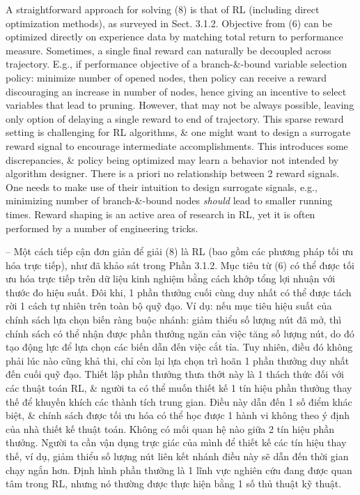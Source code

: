 \documentclass{article}
\begin{document}
\begin{itemize}
\begin{itemize}
        A straightforward approach for solving (8) is that of RL (including direct optimization methods), as surveyed in Sect. 3.1.2. Objective from (6) can be optimized directly on experience data by matching total return to performance measure. Sometimes, a single final reward can naturally be decoupled across trajectory. E.g., if performance objective of a branch-\&-bound variable selection policy: minimize number of opened nodes, then policy can receive a reward discouraging an increase in number of nodes, hence giving an incentive to select variables that lead to pruning. However, that may not be always possible, leaving only option of delaying a single reward to end of trajectory. This sparse reward setting is challenging for RL algorithms, \& one might want to design a surrogate reward signal to encourage intermediate accomplishments. This introduces some discrepancies, \& policy being optimized may learn a behavior not intended by algorithm designer. There is a priori no relationship between 2 reward signals. One needs to make use of their intuition to design surrogate signals, e.g., minimizing number of branch-\&-bound nodes {\it should} lead to smaller running times. Reward shaping is an active area of research in RL, yet it is often performed by a number of engineering tricks.

        -- Một cách tiếp cận đơn giản để giải (8) là RL (bao gồm các phương pháp tối ưu hóa trực tiếp), như đã khảo sát trong Phần 3.1.2. Mục tiêu từ (6) có thể được tối ưu hóa trực tiếp trên dữ liệu kinh nghiệm bằng cách khớp tổng lợi nhuận với thước đo hiệu suất. Đôi khi, 1 phần thưởng cuối cùng duy nhất có thể được tách rời 1 cách tự nhiên trên toàn bộ quỹ đạo. Ví dụ: nếu mục tiêu hiệu suất của chính sách lựa chọn biến ràng buộc nhánh: giảm thiểu số lượng nút đã mở, thì chính sách có thể nhận được phần thưởng ngăn cản việc tăng số lượng nút, do đó tạo động lực để lựa chọn các biến dẫn đến việc cắt tỉa. Tuy nhiên, điều đó không phải lúc nào cũng khả thi, chỉ còn lại lựa chọn trì hoãn 1 phần thưởng duy nhất đến cuối quỹ đạo. Thiết lập phần thưởng thưa thớt này là 1 thách thức đối với các thuật toán RL, \& người ta có thể muốn thiết kế 1 tín hiệu phần thưởng thay thế để khuyến khích các thành tích trung gian. Điều này dẫn đến 1 số điểm khác biệt, \& chính sách được tối ưu hóa có thể học được 1 hành vi không theo ý định của nhà thiết kế thuật toán. Không có mối quan hệ nào giữa 2 tín hiệu phần thưởng. Người ta cần vận dụng trực giác của mình để thiết kế các tín hiệu thay thế, ví dụ, giảm thiểu số lượng nút liên kết nhánh {điều này sẽ} dẫn đến thời gian chạy ngắn hơn. Định hình phần thưởng là 1 lĩnh vực nghiên cứu đang được quan tâm trong RL, nhưng nó thường được thực hiện bằng 1 số thủ thuật kỹ thuật.


\end{itemize}
\end{itemize}
\end{document}
